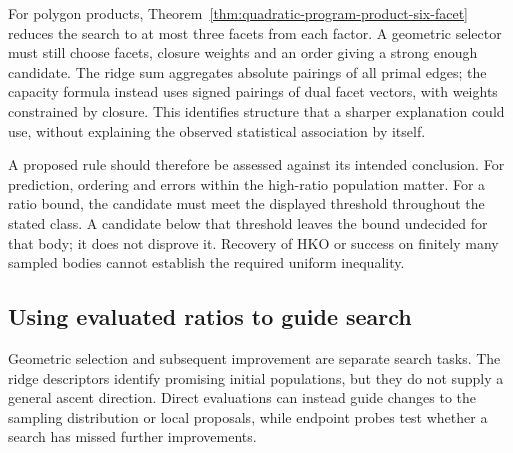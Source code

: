 For polygon products, Theorem~\ref{thm:quadratic-program-product-six-facet}
reduces the search to at most three facets from each factor. A geometric selector
must still choose facets, closure weights and an order giving a strong
enough candidate. The ridge sum aggregates absolute pairings of all primal
edges; the capacity formula instead uses signed pairings of dual facet
vectors, with weights constrained by closure. This identifies structure
that a sharper explanation could use, without explaining the observed
statistical association by itself.

A proposed rule should therefore be assessed against its intended conclusion.
For prediction, ordering and errors within the high-ratio population matter.
For a ratio bound, the candidate must meet the displayed threshold throughout
the stated class. A candidate below that threshold leaves the bound undecided
for that body; it does not disprove it. Recovery of HKO or success on finitely
many sampled bodies cannot establish the required uniform inequality.

\subsection{Using evaluated ratios to guide search}

Geometric selection and subsequent improvement are separate search tasks.
The ridge descriptors identify promising initial populations, but they do
not supply a general ascent direction. Direct evaluations can instead
guide changes to the sampling distribution or local proposals, while
endpoint probes test whether a search has missed further improvements.

